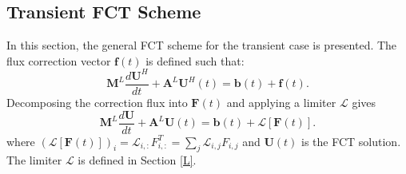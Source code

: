 \subsection{Transient FCT Scheme}
In this section, the general FCT scheme for the transient case is presented.
The flux correction vector $\mathbf{f}(t)$ is defined such that:
\begin{equation}\label{semidiscrete_f}
   \mathbf{M}^L\frac{d\mathbf{U}^{H}}{dt}
      + \mathbf{A}^L\mathbf{U}^H(t)
      = \mathbf{b}(t) + \mathbf{f}(t).
\end{equation}
Decomposing the correction flux into $\mathbf{F}(t)$ and applying a limiter
$\mathcal{L}$ gives
\begin{equation}\label{semidiscrete_limited}
   \mathbf{M}^L\frac{d\mathbf{U}}{dt}
      + \mathbf{A}^L\mathbf{U}(t)
      = \mathbf{b}(t) + \mathcal{L}[\mathbf{F}(t)].
\end{equation}
where $(\mathcal{L}[\mathbf{F}(t)])_i = \mathcal{L}_{i,:}F_{i,:}^T
= \sum\limits_j \mathcal{L}_{i,j}F_{i,j}$ and $\mathbf{U}(t)$
is the FCT solution.  The limiter $\mathcal{L}$ is
defined in Section \ref{L}.
%

